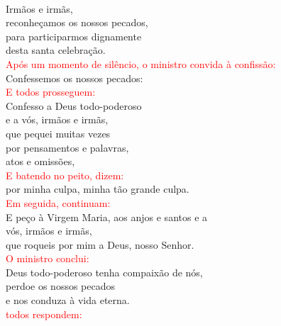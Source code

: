 \documentclass{book}
\begin{document}
\begin{flushleft}
    \vspace{.1cm} \\
    Irmãos e irmãs, \\
    reconheçamos os nossos pecados, \\
    para participarmos dignamente \\
    desta santa celebração.
    \vspace{.1cm} \\
    \textcolor{red}{Após um momento de silêncio, o ministro convida à confissão:}
    \vspace{.1cm} \\
    Confessemos os nossos pecados:
    \vspace{.1cm} \\
    \textcolor{red}{E todos prosseguem:}
    \vspace{.1cm} \\
    Confesso a Deus todo-poderoso \\
    e a vós, irmãos e irmãs, \\
    que pequei muitas vezes \\
    por pensamentos e palavras, \\
    atos e omissões,
    \vspace{.1cm} \\
    \textcolor{red}{E batendo no peito, dizem:}
    \vspace{.1cm} \\
    por minha culpa, minha tão grande culpa.
    \vspace{.1cm} \\
    \textcolor{red}{Em seguida, continuam:}
    \vspace{.1cm} \\
    E peço à Virgem Maria, aos anjos e santos e a \\
    vós, irmãos e irmãs, \\
    que roqueis por mim a Deus, nosso Senhor.
    \vspace{.1cm} \\
    \textcolor{red}{O ministro conclui:}
    \vspace{.1cm} \\
    Deus todo-poderoso tenha compaixão de nós, \\
    perdoe os nossos pecados \\
    e nos conduza à vida eterna.
    \vspace{.1cm} \\
    \textcolor{red}{todos respondem:}
    \vspace{.1cm} \\

\end{flushleft}
\end{document}
